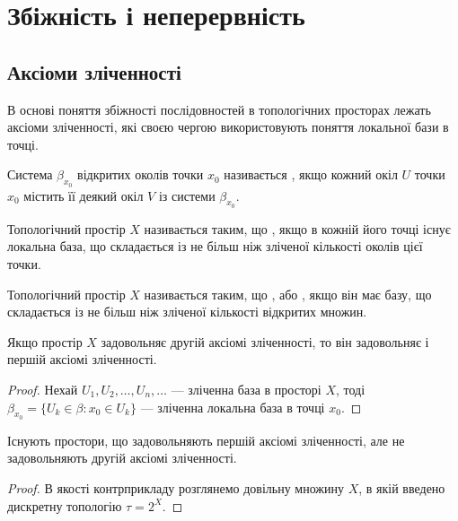 \chapter{Збіжність і неперервність}

\section{Аксіоми зліченності}

В основі поняття збіжності послідовностей в
топологічних просторах лежать аксіоми зліченності, які своєю чергою використовують поняття локальної бази в точці.

\begin{definition}
Система $\beta_{x_0}$ відкритих околів точки $x_0$
називається , якщо кожний
окіл $U$ точки $x_0$ містить її деякий окіл $V$ із системи $\beta_{x_0}$.
\end{definition}

\begin{definition}
Топологічний простір $X$ називається таким, що
, якщо в кожній
його точці існує локальна база, що складається із не більш
ніж зліченої кількості околів цієї точки.
\end{definition}

\begin{definition}
Топологічний простір $X$ називається таким, що
, або , якщо він має базу, що складається із не
більш ніж зліченої кількості відкритих множин.
\end{definition}

\begin{lemma}
Якщо простір $X$ задовольняє другій аксіомі
зліченності, то він задовольняє і першій аксіомі
зліченності.
\end{lemma}

\begin{proof}
Нехай $U_1, U_2, \ldots, U_n, \ldots$ --- зліченна база в
просторі $X$, тоді $\beta_{x_0} = \{ U_k \in \beta: x_0 \in U_k \}$ --- зліченна локальна
база в точці $x_0$.
\end{proof}

\begin{lemma}
Існують простори, що задовольняють першій
аксіомі зліченності, але не задовольняють другій аксіомі
зліченності.
\end{lemma}

\begin{proof}
В якості контрприкладу розглянемо
довільну  множину $X$, в якій введено дискретну
топологію $\tau = 2^X$.
\end{proof}

